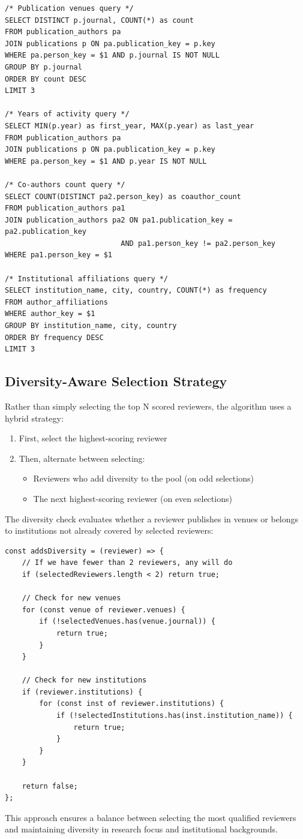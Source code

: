 \begin{verbatim}
/* Publication venues query */
SELECT DISTINCT p.journal, COUNT(*) as count
FROM publication_authors pa
JOIN publications p ON pa.publication_key = p.key
WHERE pa.person_key = $1 AND p.journal IS NOT NULL
GROUP BY p.journal
ORDER BY count DESC
LIMIT 3

/* Years of activity query */
SELECT MIN(p.year) as first_year, MAX(p.year) as last_year
FROM publication_authors pa
JOIN publications p ON pa.publication_key = p.key
WHERE pa.person_key = $1 AND p.year IS NOT NULL

/* Co-authors count query */
SELECT COUNT(DISTINCT pa2.person_key) as coauthor_count
FROM publication_authors pa1
JOIN publication_authors pa2 ON pa1.publication_key = pa2.publication_key 
                           AND pa1.person_key != pa2.person_key
WHERE pa1.person_key = $1

/* Institutional affiliations query */
SELECT institution_name, city, country, COUNT(*) as frequency
FROM author_affiliations
WHERE author_key = $1
GROUP BY institution_name, city, country
ORDER BY frequency DESC
LIMIT 3
\end{verbatim}

\subsection{Diversity-Aware Selection Strategy}
Rather than simply selecting the top N scored reviewers, the algorithm uses a hybrid strategy:

\begin{enumerate}
    \item First, select the highest-scoring reviewer
    \item Then, alternate between selecting:
    \begin{itemize}
        \item Reviewers who add diversity to the pool (on odd selections)
        \item The next highest-scoring reviewer (on even selections)
    \end{itemize}
\end{enumerate}

The diversity check evaluates whether a reviewer publishes in venues or belongs to institutions not already covered by selected reviewers:

\begin{verbatim}
const addsDiversity = (reviewer) => {
    // If we have fewer than 2 reviewers, any will do
    if (selectedReviewers.length < 2) return true;
    
    // Check for new venues
    for (const venue of reviewer.venues) {
        if (!selectedVenues.has(venue.journal)) {
            return true;
        }
    }
    
    // Check for new institutions
    if (reviewer.institutions) {
        for (const inst of reviewer.institutions) {
            if (!selectedInstitutions.has(inst.institution_name)) {
                return true;
            }
        }
    }
    
    return false;
};
\end{verbatim}

This approach ensures a balance between selecting the most qualified reviewers and maintaining diversity in research focus and institutional backgrounds. 